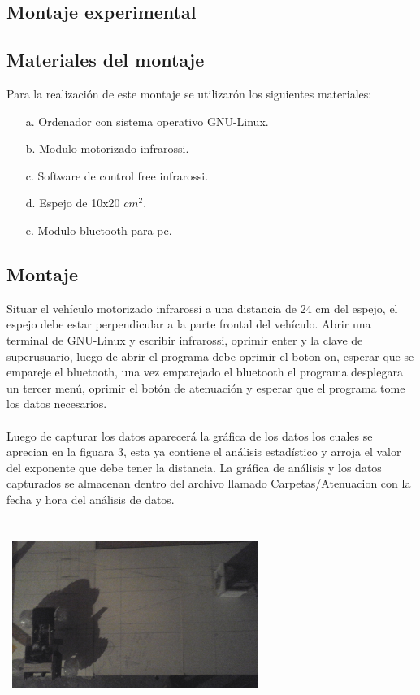 \documentclass[12]{article}
\newenvironment{Figure}
{\par\medskip\noindent\minipage{\linewidth}}
{\endminipage\par\medskip}
\begin{document}
\begin{multicols}{2}
\section{Montaje experimental}
\subsection{Materiales del montaje}
Para la realización de este montaje se utilizarón los siguientes materiales:
\begin{enumerate}
\item[a.] Ordenador con sistema operativo GNU-Linux.
\item[b.] Modulo motorizado infrarossi.
\item[c.] Software de control free infrarossi.
\item[d.] Espejo de 10x20 $cm^{2}$.
\item[e.] Modulo bluetooth para pc.
\end{enumerate}

\subsection{Montaje}
Situar el vehículo motorizado infrarossi a una distancia de 24 cm del espejo, el espejo debe estar perpendicular a la parte frontal del vehículo. Abrir una terminal de GNU-Linux y escribir infrarossi, oprimir enter y la clave de superusuario, luego de abrir el programa debe oprimir el boton on, esperar que se empareje el bluetooth, una vez emparejado el bluetooth el programa desplegara un tercer menú, oprimir el botón de atenuación y esperar que el programa tome los datos necesarios.
\\ \\
Luego de capturar los datos aparecerá la gráfica de los datos los cuales se aprecian en la figuara 3, esta ya contiene el análisis estadístico y arroja el valor del exponente que debe tener la distancia. La gráfica de análisis y los datos capturados se almacenan dentro del archivo llamado Carpetas/Atenuacion con la fecha y hora del análisis de datos.

\begin{Figure}	
\center
\begin{tabular}{|l|r|}
\hline
\includegraphics[width=8cm, height=6cm]{img/mon_difraccion.png} \\ \hline
\end{tabular}
\label{fig:g1}
\end{Figure}


\end{multicols}
\end{document}
